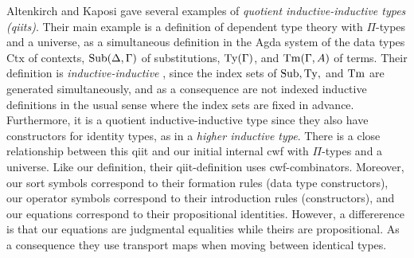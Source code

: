 \documentclass{mscs}
\newcommand{\FYI}[1]{{#1}}
\def\Ctx{\mathrm{Ctx}}
\begin{document}
Altenkirch and Kaposi \cite{altenkirch:qiits} gave several examples of {\em quotient inductive-inductive types (qiits)}. Their main example is a definition of dependent type theory with $\Pi$-types and a universe, as a simultaneous definition in the Agda system \cite{agda-wiki} of the data types $\Ctx$ of contexts, $\mathrm{Sub}(\Delta,\Gamma)$ of substitutions, $\mathrm{Ty}(\Gamma)$, and $\mathrm{Tm}(\Gamma,A)$ of terms. Their definition is {\em inductive-inductive} \cite{nordvallforsberg:iids}, since the index sets of $\mathrm{Sub}, \mathrm{Ty},$ and $\mathrm{Tm}$ are generated simultaneously, and as a consequence are not indexed inductive definitions in the usual sense where the index sets are fixed in advance. Furthermore, it is a quotient inductive-inductive type since they also have constructors for identity types, as in a {\em higher inductive type}.
There is a close relationship between this qiit and our initial internal cwf with $\Pi$-types and a universe. Like our definition, their qiit-definition uses cwf-combinators. Moreover, our sort symbols correspond to their formation rules (data type constructors), our operator symbols correspond to their introduction rules (constructors), and our equations correspond to their propositional identities. However, a differerence is that our equations are judgmental equalities while theirs are propositional. As a consequence they use transport maps when moving between identical types.

%
\end{document}
